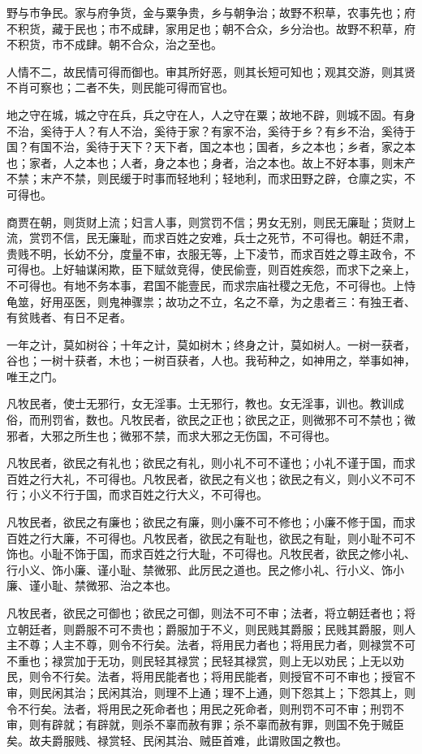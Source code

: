 \documentclass[]{article}
\begin{document}
野与市争民。家与府争货，金与粟争贵，乡与朝争治；故野不积草，农事先也；府不积货，藏于民也；市不成肆，家用足也；朝不合众，乡分治也。故野不积草，府不积货，市不成肆。朝不合众，治之至也。

人情不二，故民情可得而御也。审其所好恶，则其长短可知也；观其交游，则其贤不肖可察也；二者不失，则民能可得而官也。

地之守在城，城之守在兵，兵之守在人，人之守在粟；故地不辟，则城不固。有身不治，奚待于人？有人不治，奚待于家？有家不治，奚待于乡？有乡不治，奚待于国？有国不治，奚待于天下？天下者，国之本也；国者，乡之本也；乡者，家之本也；家者，人之本也；人者，身之本也；身者，治之本也。故上不好本事，则末产不禁；末产不禁，则民缓于时事而轻地利；轻地利，而求田野之辟，仓廪之实，不可得也。

商贾在朝，则货财上流；妇言人事，则赏罚不信；男女无别，则民无廉耻；货财上流，赏罚不信，民无廉耻，而求百姓之安难，兵士之死节，不可得也。朝廷不肃，贵贱不明，长幼不分，度量不审，衣服无等，上下凌节，而求百姓之尊主政令，不可得也。上好轴谋闲欺，臣下赋敛竞得，使民偷壹，则百姓疾怨，而求下之亲上，不可得也。有地不务本事，君国不能壹民，而求宗庙社稷之无危，不可得也。上恃龟筮，好用巫医，则鬼神骤祟；故功之不立，名之不章，为之患者三：有独王者、有贫贱者、有日不足者。

一年之计，莫如树谷；十年之计，莫如树木；终身之计，莫如树人。一树一获者，谷也；一树十获者，木也；一树百获者，人也。我茍种之，如神用之，举事如神，唯王之门。

凡牧民者，使士无邪行，女无淫事。士无邪行，教也。女无淫事，训也。教训成俗，而刑罚省，数也。凡牧民者，欲民之正也；欲民之正，则微邪不可不禁也；微邪者，大邪之所生也；微邪不禁，而求大邪之无伤国，不可得也。

凡牧民者，欲民之有礼也；欲民之有礼，则小礼不可不谨也；小礼不谨于国，而求百姓之行大礼，不可得也。凡牧民者，欲民之有义也；欲民之有义，则小义不可不行；小义不行于国，而求百姓之行大义，不可得也。

凡牧民者，欲民之有廉也；欲民之有廉，则小廉不可不修也；小廉不修于国，而求百姓之行大廉，不可得也。凡牧民者，欲民之有耻也，欲民之有耻，则小耻不可不饰也。小耻不饰于国，而求百姓之行大耻，不可得也。凡牧民者，欲民之修小礼、行小义、饰小廉、谨小耻、禁微邪、此厉民之道也。民之修小礼、行小义、饰小廉、谨小耻、禁微邪、治之本也。

凡牧民者，欲民之可御也；欲民之可御，则法不可不审；法者，将立朝廷者也；将立朝廷者，则爵服不可不贵也；爵服加于不义，则民贱其爵服；民贱其爵服，则人主不尊；人主不尊，则令不行矣。法者，将用民力者也；将用民力者，则禄赏不可不重也；禄赏加于无功，则民轻其禄赏；民轻其禄赏，则上无以劝民；上无以劝民，则令不行矣。法者，将用民能者也；将用民能者，则授官不可不审也；授官不审，则民闲其治；民闲其治，则理不上通；理不上通，则下怨其上；下怨其上，则令不行矣。法者，将用民之死命者也；用民之死命者，则刑罚不可不审；刑罚不审，则有辟就；有辟就，则杀不辜而赦有罪；杀不辜而赦有罪，则国不免于贼臣矣。故夫爵服贱、禄赏轻、民闲其治、贼臣首难，此谓败国之教也。
\end{document}

